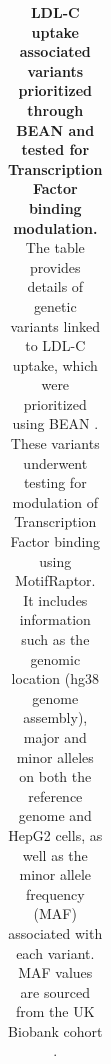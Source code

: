 \documentclass[a4paper, titlepage, openright]{book}
\newcommand{\motifraptor}{MotifRaptor\xspace}
\begin{document}
\begin{table}[!]
{\begin{tabular}{|l|l|l|l|l|l|l|l|}
    \end{tabular}%
    }
    \caption[LDL-C uptake associated variants prioritized through BEAN and tested for Transcription Factor binding modulation]{\textbf{LDL-C uptake associated variants prioritized through BEAN and tested for Transcription Factor binding modulation.} The table provides details of genetic variants linked to LDL-C uptake, which were prioritized using BEAN \citep{ryu2023joint}. These variants underwent testing for modulation of Transcription Factor binding using \motifraptor \citep{yao2021motif}. It includes information such as the genomic location (hg38 genome assembly), major and minor alleles on both the reference genome and HepG2 cells, as well as the minor allele frequency (MAF) associated with each variant. MAF values are sourced from the UK Biobank cohort \citep{bycroft2018uk}.}
    \label{tab:bean-variants}
\end{table}
%
\end{document}
